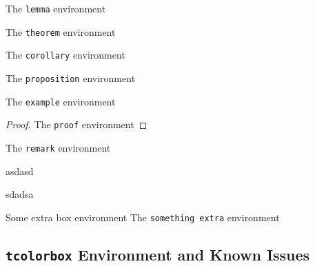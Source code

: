 \begin{lemma}[Test]
    The \texttt{lemma} environment
\end{lemma}

\begin{theorem}[Test]
    The \texttt{theorem} environment
\end{theorem}

\begin{corollary}[Test]
    The \texttt{corollary} environment
\end{corollary}

\begin{proposition}[Test]
    The \texttt{proposition} environment
\end{proposition}


\begin{example}[Test]
    The \texttt{example} environment
\end{example}

\begin{proof}
    The \texttt{proof} environment
\end{proof}


\begin{remark}
    The \texttt{remark} environment
\end{remark}

\begin{assumption}
asdasd
\end{assumption}

\begin{exercise}
sdadsa
\end{exercise}
\begin{tbox}{Some extra box environment}
    The \texttt{something extra} environment
\end{tbox}


\subsection{\texttt{tcolorbox} Environment and Known Issues}
\label{ssub:tcolorbox environments_and_known_issues}


